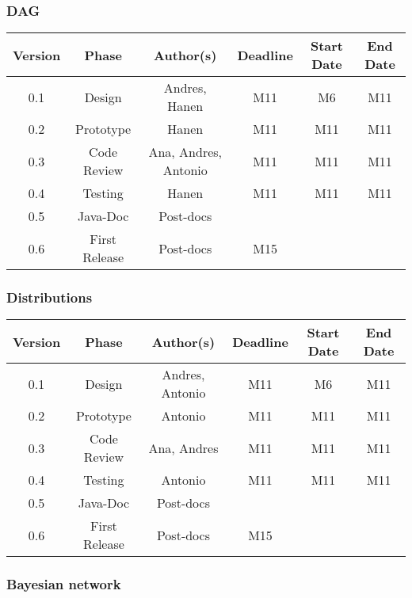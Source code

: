 \subsubsection*{DAG}

\begin{table}[H]
\begin{tabular}{cccccc}
\hline
\textbf{Version} & \textbf{Phase} & \textbf{Author(s)} & \textbf{Deadline} & \textbf{Start Date} & \textbf{End Date}\\
\hline
0.1 & Design & Andres, Hanen & M11  & M6 & M11\\
\hline 
0.2 & Prototype & Hanen & M11 & M11 & M11\\
\hline 
0.3 & Code Review & Ana, Andres, Antonio & M11 & M11 & M11\\
\hline 
0.4 & Testing & Hanen & M11 & M11 & M11\\
\hline 
0.5 & Java-Doc  & Post-docs &  &  & \\
\hline 
0.6 & First Release & Post-docs & M15 &  & \\
\hline
\end{tabular}
\end{table}

\subsubsection*{Distributions}
\begin{table}[H]
\begin{tabular}{cccccc}
\hline
\textbf{Version} & \textbf{Phase} & \textbf{Author(s)} & \textbf{Deadline} & \textbf{Start Date} & \textbf{End Date}\\
\hline
0.1 & Design & Andres, Antonio &  M11 & M6 & M11\\
\hline 
0.2 & Prototype & Antonio & M11  & M11 & M11\\
\hline 
0.3 & Code Review & Ana, Andres & M11 & M11 & M11\\
\hline 
0.4 & Testing &  Antonio & M11  & M11  & M11\\
\hline 
0.5 & Java-Doc  & Post-docs &  &  & \\
\hline 
0.6 & First Release & Post-docs & M15 &  & \\
\hline
\end{tabular}
\end{table}


\subsubsection*{Bayesian network}

